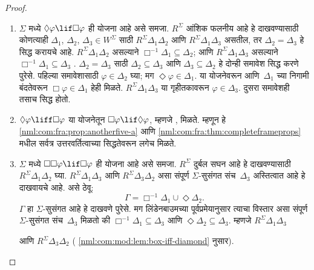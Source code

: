 \begin{proof}
  \begin{enumerate}
  \item $\Sigma$ मध्ये
    $\Diamond \varphi \lif \Box \varphi$
    ही योजना आहे असे समजा.
    $R^\Sigma$ आंशिक फलनीय आहे हे
    दाखवण्यासाठी कोणत्याही
    $\Delta_1$, $\Delta_2$,
    $\Delta_3 \in W^\Sigma$
    साठी $R^\Sigma \Delta_1\Delta_2$
    आणि $R^\Sigma \Delta_1\Delta_3$
    असतील, तर $\Delta_2=\Delta_3$
    हे सिद्ध करायचे आहे.
    $R^\Sigma \Delta_1\Delta_2$
    असल्याने $\Box^{-1}\Delta_1
    \subseteq \Delta_2$;
    आणि $R^\Sigma \Delta_1\Delta_3$
    असल्याने $\Box^{-1}\Delta_1
    \subseteq \Delta_3$
    .
    $\Delta_2=\Delta_3$ साठी
    $\Delta_2 \subseteq \Delta_3$
    आणि $\Delta_3 \subseteq \Delta_2$
    हे दोन्ही समावेश सिद्ध करणे पुरेसे.
    पहिल्या समावेशासाठी
    $\varphi \in \Delta_2$ घ्या;
    मग $\Diamond\varphi \in \Delta_1$.
    या योजनेवरून आणि~$\Delta_1$ च्या
    निगामी बंदतेवरून
    $\Box\varphi \in \Delta_1$ हेही मिळते.
    $R^\Sigma \Delta_1\Delta_3$
    या गृहीतकावरून $\varphi \in \Delta_3$.
    दुसरा समावेशही तसाच सिद्ध होतो.

  \item $\Diamond\varphi \liff \Box\varphi$ या योजनेतून
    $\Box\varphi \lif \Diamond\varphi$, म्हणजे , मिळते.
    म्हणून हे \ref{nml:com:fra:prop:anotherfive-a}
    आणि \ref{nml:com:fra:thm:completeframeprops}
    मधील सर्वत्र उत्तरवर्तित्वाच्या
    सिद्धतेवरून लगेच मिळते.

  \item $\Sigma$ मध्ये
    $\Box\Box\varphi \lif \Box\varphi$
    ही योजना आहे असे समजा.
    $R^\Sigma$ दुर्बल सघन आहे हे
    दाखवण्यासाठी $R^\Sigma
    \Delta_1\Delta_2$ घ्या.
    $R^\Sigma \Delta_1\Delta_3$
    आणि $R^\Sigma \Delta_3\Delta_2$
    असा संपूर्ण $\Sigma$-सुसंगत
    संच~$\Delta_3$ अस्तित्वात आहे
    हे दाखवायचे आहे. असे ठेवू:
    \[    \Gamma = \Box^{-1}\Delta_1 \cup \Diamond\Delta_2.
    \]
    $\Gamma$ हा $\Sigma$-सुसंगत
    आहे हे दाखवणे पुरेसे. मग
    लिंडेनबाउमच्या पूर्वप्रमेयानुसार
    त्याचा विस्तार असा संपूर्ण
    $\Sigma$-सुसंगत संच~$\Delta_3$
    मिळतो की $\Box^{-1}\Delta_1
    \subseteq \Delta_3$ आणि
    $\Diamond\Delta_2 \subseteq \Delta_3$.
    म्हणजे $R^\Sigma \Delta_1\Delta_3$

    आणि $R^\Sigma \Delta_3\Delta_2$
    (
      \ref{nml:com:mod:lem:box-iff-diamond} नुसार).


\end{enumerate}
\end{proof}
